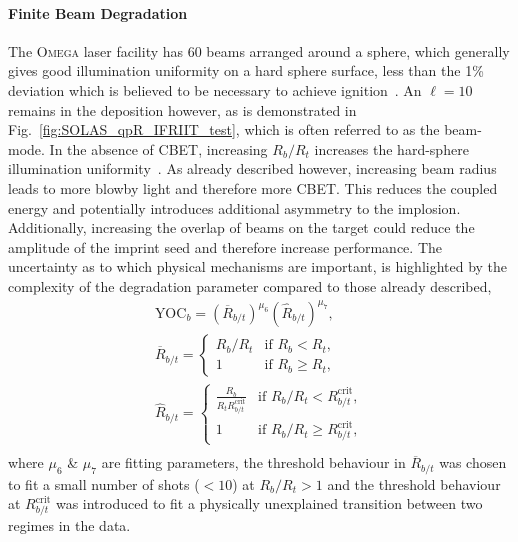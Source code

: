 \paragraph*{Finite Beam Degradation}
The \textsc{Omega} laser facility has 60 beams arranged around a sphere, which generally gives good illumination uniformity on a hard sphere surface, less than the 1\% deviation which is believed to be necessary to achieve ignition~\cite{craxton_directdrive_2015,goncharov_national_2017}.
An $\ell=10$ remains in the deposition however, as is demonstrated in Fig.~\ref{fig:SOLAS_qpR_IFRIIT_test}, which is often referred to as the beam-mode.
In the absence of \ac{CBET}, increasing $R_b/R_t$ increases the hard-sphere illumination uniformity~\cite{gopalaswamy_using_2021}.
As already described however, increasing beam radius leads to more blowby light and therefore more \ac{CBET}.
This reduces the coupled energy and potentially introduces additional asymmetry to the implosion.
Additionally, increasing the overlap of beams on the target could reduce the amplitude of the imprint seed and therefore increase performance.
The uncertainty as to which physical mechanisms are important, is highlighted by the complexity of the degradation parameter compared to those already described,
\begin{equation}
    \label{eq:Res1_RbRt_degradation}
    \begin{gathered}
        \text{YOC}_{b} = \left( \overline{R}_{b/t} \right)^{\mu_6} \left( \hat{R}_{b/t} \right)^{\mu_7}, \\
        \overline{R}_{b/t} =
        \begin{cases}
            R_b/R_t & \text{if } R_b<R_t, \\
            1 &  \text{if } R_b\geq R_t,
        \end{cases} \\
        \hat{R}_{b/t} =
        \begin{cases}
            \frac{R_b}{R_t R_{b/t}^{\text{crit}}} & \text{if } R_b/R_t < R_{b/t}^{\text{crit}}, \\
            1 & \text{if } R_b/R_t \geq R_{b/t}^{\text{crit}},
        \end{cases} \\
    \end{gathered}
\end{equation}
where $\mu_6$ \& $\mu_7$ are fitting parameters, the threshold behaviour in $\overline{R}_{b/t}$ was chosen to fit a small number of shots ($<10$) at $R_b/R_t>1$ and the threshold behaviour at $R_{b/t}^{\text{crit}}$ was introduced to fit a physically unexplained transition between two regimes in the data.

